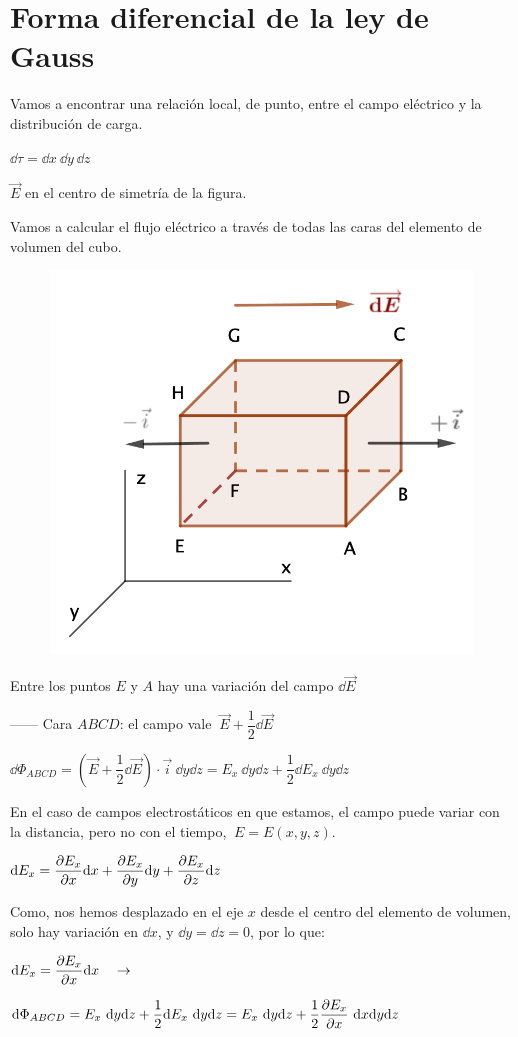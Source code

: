 \section{Forma diferencial de la ley de Gauss}

\begin{multicols}{2}
Vamos a encontrar una relación local, de punto, entre el campo eléctrico y la distribución de carga.

$\dd \tau=\dd x\ \dd y \ \dd z$

$\vec E$ en el centro de simetría de la figura.

Vamos a calcular el flujo eléctrico a través de todas las caras del elemento de volumen del cubo.
 
\begin{figure}[H]
	\centering
	\includegraphics[width=.4\textwidth]{imagenes/imagenes23/T23IM11.png}
\end{figure}	
\end{multicols}

Entre los puntos $E$ y $A$ hay una variación del campo $\dd \vec E$

------ Cara $ABCD$: el campo vale $\ \vec E + \dfrac 1 2 \dd \vec E$

$\dd \Phi_{ABCD}=\left( \vec E + \dfrac 1 2 \dd \vec E \right) \cdot \vec i \ \dd y \dd z=E_x \ \dd y \dd z + \dfrac 1 2 \dd E_x \ \dd y \dd z$ 

En el caso de campos electrostáticos en que estamos, el campo puede variar con la distancia, pero no con el tiempo, $\ E=E(x,y,z)$.

$\displaystyle \dd E_x=\pdv{E_x}{x} \dd x+\pdv{E_x}{y} \dd y+\pdv{E_x}{z} \dd z$

Como, nos hemos desplazado en el eje $x$ desde el centro del elemento de volumen, solo hay variación en $\dd x$, y $\dd y=\dd z=0$, por lo que: 

$\displaystyle \dd E_x=\pdv{E_x}{x} \dd x \quad \to \quad$

$\displaystyle \dd \Phi_{ABCD}=
E_x \ \dd y \dd z + \dfrac 1 2 \dd E_x \ \dd y \dd z=
E_x \ \dd y \dd z + \dfrac 1 2 \pdv{E_x}{x} \ \dd x \dd y \dd z$

